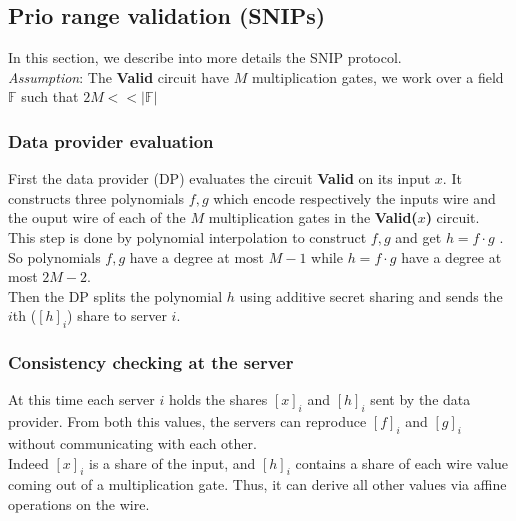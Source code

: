 \documentclass{article}
\begin{document}
\subsection{Prio range validation (SNIPs)}
In this section, we describe into more details the SNIP protocol.\\
\textit{Assumption}: The \textbf{Valid} circuit have $M$ multiplication gates, we work over a field $\mathbb{F}$ such that $ 2M << |\mathbb{F}| $\\
\subsubsection{Data provider evaluation}
First the data provider (DP) evaluates the circuit \textbf{Valid} on its input $x$. It constructs three polynomials $f,g $ which encode respectively the inputs wire and the ouput wire of each of the $M$ multiplication gates in the \textbf{Valid($x$)} circuit.\\
This step is done by polynomial interpolation to construct $f,g$ and get $h = f \cdot g$ .\\
So polynomials $f,g$ have a degree at most $M-1$ while $h = f \cdot g$ have a degree at most $2M-2$.\\
Then the DP splits the polynomial $h$ using additive secret sharing and sends the $i$th ($[h]_i$) share to server $i$.
\subsubsection{Consistency checking at the server}
At this time each server $i$ holds the shares $[x]_i$ and $[h]_i$ sent by the data provider. From both this values, the servers can reproduce $[f]_i$ and $[g]_i$ without communicating with each other.\\
Indeed $[x]_i$ is a share of the input, and $[h]_i$ contains a share of each wire value coming out of a multiplication gate. Thus, it can derive all other values via affine operations on the wire.
\end{document}
